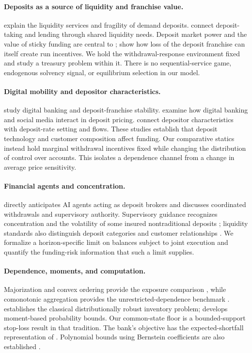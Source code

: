 \documentclass[11pt]{article}
\theoremstyle{definition}\newtheorem{definition}[theorem]{Definition}
\begin{document}
\paragraph{Deposits as a source of liquidity and franchise value.}
\citet{diamond1983} explain the liquidity services and fragility of demand deposits. \citet{kashyap2002} connect deposit-taking and lending through shared liquidity needs. Deposit market power and the value of sticky funding are central to \citet{drechsler2017}; \citet{drechsler2026} show how loss of the deposit franchise can itself create run incentives. We hold the withdrawal-response environment fixed and study a treasury problem within it. There is no sequential-service game, endogenous solvency signal, or equilibrium selection in our model.

\paragraph{Digital mobility and depositor characteristics.}
\citet{koont2024} study digital banking and deposit-franchise stability. \citet{brei2026} examine how digital banking and social media interact in deposit pricing. \citet{narayanan2024} connect depositor characteristics with deposit-rate setting and flows. These studies establish that deposit technology and customer composition affect funding. Our comparative statics instead hold marginal withdrawal incentives fixed while changing the distribution of control over accounts. This isolates a dependence channel from a change in average price sensitivity.

\paragraph{Financial agents and concentration.}
\citet{phillips2025} directly anticipates AI agents acting as deposit brokers and discusses coordinated withdrawals and supervisory authority. Supervisory guidance recognizes concentration and the volatility of some insured nontraditional deposits \citep{robinson2024}; liquidity standards also distinguish deposit categories and customer relationships \citep{basel2013}. We formalize a horizon-specific limit on balances subject to joint execution and quantify the funding-risk information that such a limit supplies.

\paragraph{Dependence, moments, and computation.}
Majorization and convex ordering provide the exposure comparison \citep{marshall2011}, while comonotonic aggregation provides the unrestricted-dependence benchmark \citep{dhaene2002}. \citet{scarf1958} establishes the classical distributionally robust inventory problem; \citet{bertsimas2005} develops moment-based probability bounds. Our common-state floor is a bounded-support stop-loss result in that tradition. The bank's objective has the expected-shortfall representation of \citet{rockafellar2002}. Polynomial bounds using Bernstein coefficients are also established \citep{bensassi2015}.
\end{document}
